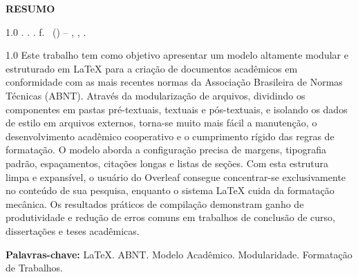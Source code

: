 
\begin{center}
  \textbf{RESUMO}
\end{center}

\vspace{0.8cm}

\begin{spacing}{1.0}
  \noindent
  \MakeUppercase{\meuautor}. \textbf{\meutitulo}. \meuano. \pageref{LastPage} f. \tipotrabalho\ (\grauacademicopretendido) -- \minhainstituicao, \meulocal, \meuano.
\end{spacing}

\vspace{0.8cm}

\begin{spacing}{1.0}
  \noindent
  Este trabalho tem como objetivo apresentar um modelo altamente modular e estruturado em LaTeX para a criação de documentos acadêmicos em conformidade com as mais recentes normas da Associação Brasileira de Normas Técnicas (ABNT). Através da modularização de arquivos, dividindo os componentes em pastas pré-textuais, textuais e pós-textuais, e isolando os dados de estilo em arquivos externos, torna-se muito mais fácil a manutenção, o desenvolvimento acadêmico cooperativo e o cumprimento rígido das regras de formatação. O modelo aborda a configuração precisa de margens, tipografia padrão, espaçamentos, citações longas e listas de seções. Com esta estrutura limpa e expansível, o usuário do Overleaf consegue concentrar-se exclusivamente no conteúdo de sua pesquisa, enquanto o sistema LaTeX cuida da formatação mecânica. Os resultados práticos de compilação demonstram ganho de produtividade e redução de erros comuns em trabalhos de conclusão de curso, dissertações e teses acadêmicas.
\end{spacing}

\vspace{1cm}

\noindent
\textbf{Palavras-chave:} LaTeX. ABNT. Modelo Acadêmico. Modularidade. Formatação de Trabalhos.
